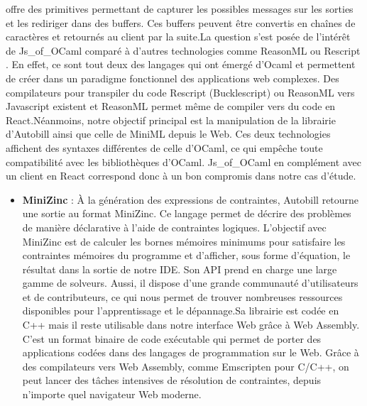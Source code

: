 \documentclass[12pt]{article}
\begin{document}
\begin{itemize}
                  offre des primitives permettant de capturer les possibles messages sur
                  les sorties et les rediriger dans des buffers. Ces buffers peuvent
                  être convertis en chaînes de caractères et retournés au client par la
                  suite.\newline  La question s'est posée de l'intérêt de Js\_of\_OCaml
                  comparé à d'autres technologies comme ReasonML
                  \cite{reasonml} ou Rescript
                  \cite{rescript}. En effet, ce sont tout
                  deux des langages qui ont émergé d'Ocaml et permettent de créer dans
                  un paradigme fonctionnel des applications web complexes. Des
                  compilateurs pour transpiler du code Rescript (Bucklescript) ou
                  ReasonML vers Javascript existent et ReasonML permet même de compiler
                  vers du code en React.\newline  Néanmoins, notre objectif principal
                  est la manipulation de la librairie d'Autobill ainsi que celle de
                  MiniML depuis le Web. Ces deux technologies affichent des syntaxes
                  différentes de celle d'OCaml, ce qui empêche toute compatibilité avec
                  les bibliothèques d'OCaml. Js\_of\_OCaml en complément avec un client
                  en React correspond donc à un bon compromis dans notre cas d'étude.
      \end{itemize}
      \begin{itemize}
            \item
                  \textbf{MiniZinc} \cite{minizinc} : À la
                  génération des expressions de contraintes, Autobill retourne une
                  sortie au format MiniZinc. Ce langage permet de décrire des problèmes
                  de manière déclarative à l'aide de contraintes logiques. L'objectif
                  avec MiniZinc est de calculer les bornes mémoires minimums pour
                  satisfaire les contraintes mémoires du programme et d'afficher, sous
                  forme d'équation, le résultat dans la sortie de notre IDE. Son API
                  prend en charge une large gamme de solveurs. Aussi, il dispose d'une
                  grande communauté d'utilisateurs et de contributeurs, ce qui nous
                  permet de trouver nombreuses ressources disponibles pour
                  l'apprentissage et le dépannage.\newline  Sa librairie est codée en
                  C++ mais il reste utilisable dans notre interface Web grâce à Web
                  Assembly. C'est un format binaire de code exécutable qui permet de
                  porter des applications codées dans des langages de programmation sur
                  le Web. Grâce à des compilateurs vers Web Assembly, comme Emscripten
                  pour C/C++, on peut lancer des tâches intensives de résolution de
                  contraintes, depuis n'importe quel navigateur Web moderne.
      \end{itemize}
\fi
\end{document}

